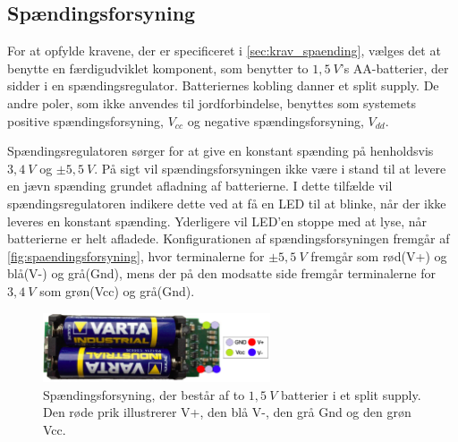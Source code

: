 \subsection{Spændingsforsyning}
For at opfylde kravene, der er specificeret i \autoref{sec:krav_spaending}, vælges det at benytte en færdigudviklet komponent, som benytter to $1,5~V$'s AA-batterier, der sidder i en spændingsregulator. Batteriernes kobling danner et split supply. De andre poler, som ikke anvendes til jordforbindelse, benyttes som systemets positive spændingsforsyning, ${V}_{cc}$ og negative spændingsforsyning, ${V}_{dd}$.

Spændingsregulatoren sørger for at give en konstant spænding på henholdsvis $3,4~V$ og $\pm 5,5~V$. På sigt vil spændingsforsyningen ikke være i stand til at levere en jævn spænding grundet afladning af batterierne. I dette tilfælde vil spændingsregulatoren indikere dette ved at få en LED til at blinke, når der ikke leveres en konstant spænding. Yderligere vil LED'en stoppe med at lyse, når batterierne er helt afladede. 
Konfigurationen af spændingsforsyningen fremgår af \autoref{fig:spaendingsforsyning}, hvor terminalerne for $\pm 5,5~V$ fremgår som rød(V+) og blå(V-) og grå(Gnd), mens der på den modsatte side fremgår terminalerne for $3,4~V$ som grøn(Vcc) og grå(Gnd). 

\begin{figure}[H]
\centering
\includegraphics[width=0.6\textwidth]{figures/spaendingsforsyning}
\caption{Spændingsforsyning, der består af to $1,5~V$ batterier i et split supply. Den røde prik illustrerer V+, den blå V-, den grå Gnd og den grøn Vcc.}
\label{fig:spaendingsforsyning}
\end{figure}

